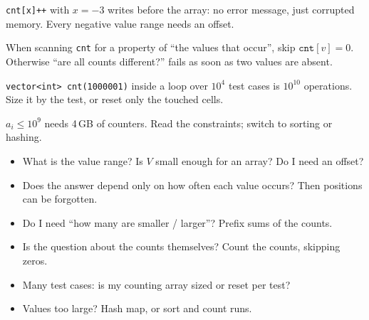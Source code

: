 \begin{warningbox}
\texttt{cnt[x]++} with $x = -3$ writes before the array: no error message, just corrupted memory. Every negative value range needs an offset.
\end{warningbox}

\begin{warningbox}
When scanning \texttt{cnt} for a property of ``the values that occur'', skip $\texttt{cnt}[v] = 0$. Otherwise ``are all counts different?'' fails as soon as two values are absent.
\end{warningbox}

\begin{warningbox}
\texttt{vector<int> cnt(1000001)} inside a loop over $10^4$ test cases is $10^{10}$ operations. Size it by the test, or reset only the touched cells.
\end{warningbox}

\begin{warningbox}
$a_i \le 10^9$ needs 4\,GB of counters. Read the constraints; switch to sorting or hashing.
\end{warningbox}

\begin{checklistbox}
\begin{itemize}[leftmargin=*]
    \item[$\square$] What is the value range? Is $V$ small enough for an array? Do I need an offset?
    \item[$\square$] Does the answer depend only on how often each value occurs? Then positions can be forgotten.
    \item[$\square$] Do I need ``how many are smaller / larger''? Prefix sums of the counts.
    \item[$\square$] Is the question about the counts themselves? Count the counts, skipping zeros.
    \item[$\square$] Many test cases: is my counting array sized or reset per test?
    \item[$\square$] Values too large? Hash map, or sort and count runs.
\end{itemize}
\end{checklistbox}
